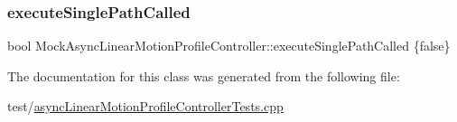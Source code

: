 \subsubsection{\texorpdfstring{executeSinglePathCalled}{executeSinglePathCalled}}
{\footnotesize\ttfamily bool Mock\+Async\+Linear\+Motion\+Profile\+Controller\+::execute\+Single\+Path\+Called \{false\}}



The documentation for this class was generated from the following file\+:\begin{DoxyCompactItemize}
\item 
test/\mbox{\hyperlink{asyncLinearMotionProfileControllerTests_8cpp}{async\+Linear\+Motion\+Profile\+Controller\+Tests.\+cpp}}\end{DoxyCompactItemize}
